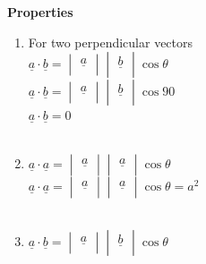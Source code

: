 \documentclass[11pt,a4paper]{article}
\begin{document}
\textbf{Properties}
\begin{enumerate}
\item For two perpendicular vectors\\


$\underline{a}\cdot \underline{b} = \begin{vmatrix}
\underline{a}\\
\end{vmatrix} \begin{vmatrix}
\underline{b}\\
\end{vmatrix}\cos \theta$\\

$\underline{a}\cdot \underline{b} = \begin{vmatrix}
\underline{a}\\
\end{vmatrix} \begin{vmatrix}
\underline{b}\\
\end{vmatrix}\cos 90$\\


$\underline{a}\cdot \underline{b} = 0$\\\\




\item $\underline{a}\cdot \underline{a} = \begin{vmatrix}
\underline{a}\\
\end{vmatrix} \begin{vmatrix}
\underline{a}\\
\end{vmatrix}\cos \theta$\\

$\underline{a}\cdot \underline{a} = \begin{vmatrix}
\underline{a}\\
\end{vmatrix} \begin{vmatrix}
\underline{a}\\
\end{vmatrix}\cos \theta = a^2$\\\\



\item $\underline{a}\cdot \underline{b} = \begin{vmatrix}
\underline{a}\\
\end{vmatrix} \begin{vmatrix}
\underline{b}\\
\end{vmatrix}\cos \theta$\\


\end{enumerate}
\end{document}
